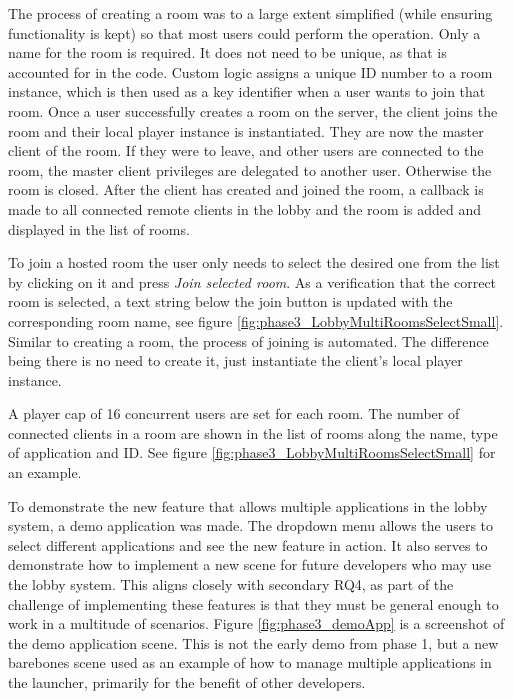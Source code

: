 The process of creating a room was to a large extent simplified (while ensuring functionality is kept) so that most users could perform the operation. Only a name for the room is required. It does not need to be unique, as that is accounted for in the code. Custom logic assigns a unique ID number to a room instance, which is then used as a key identifier when a user wants to join that room. Once a user successfully creates a room on the server, the client joins the room and their local player instance is instantiated. They are now the master client of the room. If they were to leave, and other users are connected to the room, the master client privileges are delegated to another user. Otherwise the room is closed. After the client has created and joined the room, a callback is made to all connected remote clients in the lobby and the room is added and displayed in the list of rooms. 

To join a hosted room the user only needs to select the desired one from the list by clicking on it and press \textit{Join selected room}. As a verification that the correct room is selected, a text string below the join button is updated with the corresponding room name, see figure \ref{fig:phase3_LobbyMultiRoomsSelectSmall}. Similar to creating a room, the process of joining is automated. The difference being there is no need to create it, just instantiate the client's local player instance. 

A player cap of 16 concurrent users are set for each room. The number of connected clients in a room are shown in the list of rooms along the name, type of application and ID. See figure \ref{fig:phase3_LobbyMultiRoomsSelectSmall} for an example.  


To demonstrate the new feature that allows multiple applications in the lobby system, a demo application was made. The dropdown menu allows the users to select different applications and see the new feature in action. It also serves to demonstrate how to implement a new scene for future developers who may use the lobby system. This aligns closely with secondary RQ4, as part of the challenge of implementing these features is that they must be general enough to work in a multitude of scenarios. Figure \ref{fig:phase3_demoApp} is a screenshot of the demo application scene. This is not the early demo from phase 1, but a new barebones scene used as an example of how to manage multiple applications in the launcher, primarily for the benefit of other developers.  


